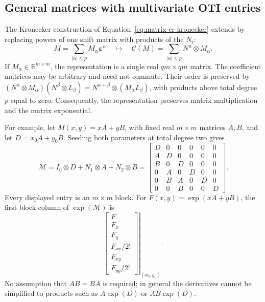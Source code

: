 \newpage
\subsection{General matrices with multivariate OTI entries}
\label{sec:multi-matrix-arguments}
The Kronecker construction of Equation~\eqref{eq:matrix-cr-kronecker} extends
by replacing powers of one shift matrix with products of the $N_i$:
\begin{equation}
\label{eq:multi-block-cr}
 M=\sum_{|\alpha|\leq p}M_\alpha\boldsymbol\varepsilon^\alpha
 \quad\longmapsto\quad
 \boxed{\mathcal C(M)=\sum_{|\alpha|\leq p}N^\alpha\otimes M_\alpha}.
\end{equation}
If $M_\alpha\in\mathbb R^{m\times m}$, the representation is a single real
$qm\times qm$ matrix. The coefficient matrices may be arbitrary and need not
commute. Their order is preserved by
$(N^\alpha\otimes M_\alpha)(N^\beta\otimes L_\beta)
 =N^{\alpha+\beta}\otimes(M_\alpha L_\beta)$,
with products above total degree $p$ equal to zero. Consequently, the
representation preserves matrix multiplication and the matrix exponential.

For example, let $M(x,y)=xA+yB$, with fixed real $m\times m$ matrices $A,B$,
and let $D=x_0A+y_0B$. Seeding both parameters at total degree two gives
\begin{equation}
\label{eq:multi-affine-block}
 \mathcal M=I_6\otimes D+N_1\otimes A+N_2\otimes B
 =\begin{bmatrix}
 D&0&0&0&0&0\\
 A&D&0&0&0&0\\
 B&0&D&0&0&0\\
 0&A&0&D&0&0\\
 0&B&A&0&D&0\\
 0&0&B&0&0&D
 \end{bmatrix}.
\end{equation}
Every displayed entry is an $m\times m$ block. For
$F(x,y)=\exp(xA+yB)$, the first block column of $\exp(\mathcal M)$ is
\begin{equation}
\label{eq:multi-matrix-extraction}
 \left.\begin{bmatrix}
 F\\F_x\\F_y\\F_{xx}/2!\\F_{xy}\\F_{yy}/2!
 \end{bmatrix}\right|_{(x_0,y_0)}.
\end{equation}
No assumption that $AB=BA$ is required; in general the derivatives cannot be
simplified to products such as $A\exp(D)$ or $AB\exp(D)$.

